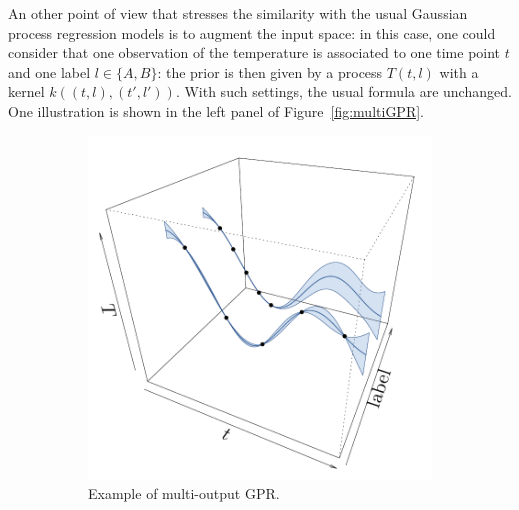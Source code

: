 \documentclass[twoside,openright]{report}
\begin{document}
An other point of view that stresses the similarity with the usual Gaussian process regression models is to augment the input space: in this case, one could consider that one observation of the temperature is associated to one time point $t$ and one label $l \in \{ A, B\}$: the prior is then given by a process $T(t,l)$ with a kernel $k((t,l),(t',l'))$. With such settings, the usual formula are unchanged. One illustration is shown in the left panel of Figure~\ref{fig:multiGPR}.

\begin{figure}
        \centering
        \begin{subfigure}[b]{0.44\textwidth}
                \includegraphics[width=\textwidth]{figures/ch2_multiGPR}
                \caption{Example of multi-output GPR. \\ \ }
        \end{subfigure}%
        \hspace{1cm}       
        \begin{subfigure}[b]{0.44\textwidth}

\end{subfigure}
\end{figure}
\end{document}
